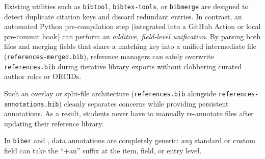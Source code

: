 \documentclass[12pt, twoside]{article}
\newcommand{\fname}[1]{\texttt{#1}}
\begin{document}
Existing utilities such as \texttt{bibtool}, \texttt{bibtex-tools}, or \texttt{bibmerge} are designed to detect duplicate citation keys and discard redundant entries. In contrast, an automated Python pre-compilation step (\eg integrated into a GitHub Action or local pre-commit hook) can perform an \emph{additive, field-level unification}. By parsing both files and merging fields that share a matching key into a unified intermediate file (\eg \fname{references-merged.bib}), reference managers can safely overwrite \fname{references.bib} during iterative library exports without clobbering curated author roles or \glspl{ORCID}.

Such an overlay or split-file architecture (\fname{references.bib} alongside \fname{references-annotations.bib}) cleanly separates concerns while providing persistent annotations. As a result, students never have to manually re-annotate files after updating their reference library.

In \texttt{biber} and \BibLaTeX{}, data annotations are completely generic: \emph{any} standard or custom field can take the \enquote{+an} suffix at the item, field, or entry level.
\end{document}
